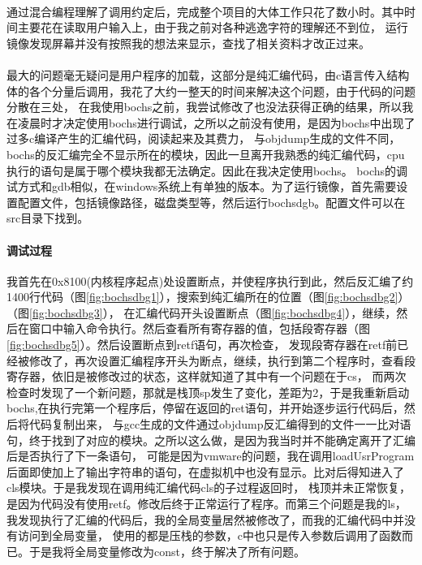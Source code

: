 \documentclass[a4paper, 11pt]{article} %
\begin{document}
\paragraph{}
通过混合编程理解了调用约定后，完成整个项目的大体工作只花了数小时。其中时间主要花在读取用户输入上，由于我之前对各种逃逸字符的理解还不到位，
运行镜像发现屏幕并没有按照我的想法来显示，查找了相关资料才改正过来。
\paragraph{}
最大的问题毫无疑问是用户程序的加载，这部分是纯汇编代码，由c语言传入结构体的各个分量后调用，我花了大约一整天的时间来解决这个问题，由于代码的问题分散在三处，
在我使用bochs之前，我尝试修改了也没法获得正确的结果，所以我在凌晨时才决定使用bochs进行调试，之所以之前没有使用，是因为bochs中出现了过多c编译产生的汇编代码，阅读起来及其费力，
与objdump生成的文件不同，bochs的反汇编完全不显示所在的模块，因此一旦离开我熟悉的纯汇编代码，cpu执行的语句是属于哪个模块我都无法确定。因此在我决定使用bochs。
bochs的调试方式和gdb相似，在windows系统上有单独的版本。为了运行镜像，首先需要设置配置文件，包括镜像路径，磁盘类型等，然后运行bochsdgb。配置文件可以在src目录下找到。
\paragraph{调试过程}
我首先在0x8100(内核程序起点)处设置断点，并使程序执行到此，然后反汇编了约1400行代码（图\ref{fig:bochsdbg1}），搜索到纯汇编所在的位置（图\ref{fig:bochsdbg2}）（图\ref{fig:bochsdbg3}），
在汇编代码开头设置断点（图\ref{fig:bochsdbg4}），继续，然后在窗口中输入命令执行。然后查看所有寄存器的值，包括段寄存器（图\ref{fig:bochsdbg5}）。然后设置断点到retf语句，再次检查，
发现段寄存器在retf前已经被修改了，再次设置汇编程序开头为断点，继续，执行到第二个程序时，查看段寄存器，依旧是被修改过的状态，这样就知道了其中有一个问题在于cs，
而两次检查时发现了一个新问题，那就是栈顶sp发生了变化，差距为2，于是我重新启动bochs,在执行完第一个程序后，停留在返回的ret语句，并开始逐步运行代码后，然后将代码复制出来，
与gcc生成的文件通过objdump反汇编得到的文件一一比对语句，终于找到了对应的模块。之所以这么做，是因为我当时并不能确定离开了汇编后是否执行了下一条语句，
可能是因为vmware的问题，我在调用loadUsrProgram后面即使加上了输出字符串的语句，在虚拟机中也没有显示。比对后得知进入了cls模块。于是我发现在调用纯汇编代码cls的子过程返回时，
栈顶并未正常恢复，是因为代码没有使用retf。修改后终于正常运行了程序。而第三个问题是我的ls，我发现执行了汇编的代码后，我的全局变量居然被修改了，而我的汇编代码中并没有访问到全局变量，
使用的都是压栈的参数，c中也只是传入参数后调用了函数而已。于是我将全局变量修改为const，终于解决了所有问题。
\end{document}
